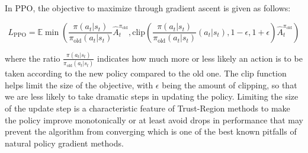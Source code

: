 In PPO, the objective to maximize through gradient ascent is given as follows:

\[
L_{\text{PPO}} = \mathbb{E}\min\left(\frac{\pi(a_t | s_t)}{\pi_{\text{old}}(a_t|s_t)}\hat{A}^{\pi_{\text{old}}}_t, \text{clip}\left(\frac{\pi(a_t | s_t)}{\pi_\text{old}(a_t | s_t)}(a_t | s_t), 1 - \epsilon, 1 + \epsilon \right) \hat{A}^{\pi_{\text{old}}}_t \right)
\] 

where the ratio $\frac{\pi(a_t | s_t)}{\pi_{\text{old}}(a_t|s_t)}$ indicates how much more or less likely an action is to be taken according to the new policy compared to the old one. The clip function helps limit the size of the objective, with $\epsilon$ being the amount of clipping, so that we are less likely to take dramatic steps in updating the policy. Limiting the size of the update step is a characteristic feature of Trust-Region\cite{Schulman2015TrustRP} methods to make the policy improve monotonically or at least avoid drops in performance that may prevent the algorithm from converging which is one of the best known pitfalls of natural policy gradient methods.



